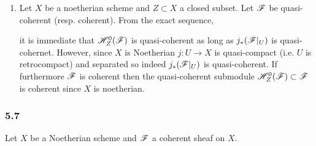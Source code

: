 \documentclass[12pt]{article}
\begin{document}
\begin{enumerate}
\item Let $X$ be a noetherian scheme and $Z \subset X$ a closed subset. Let $\mathscr{F}$ be quasi-coherent (resp. coherent). From the exact sequence,
\begin{center}
\end{center}
it is immediate that $\mathscr{H}^0_Z(\mathscr{F})$ is quasi-coherent as long as $j_* (\mathscr{F}|_U)$ is quasi-cohernet. However, since $X$ is Noetherian $j : U \to X$ is quasi-compact (i.e. $U$ is retrocompact) and separated so indeed $j_* (\mathscr{F}|_U)$ is quasi-coherent. If furthermore $\mathscr{F}$ is coherent then the quasi-coherent submodule $\mathscr{H}^0_Z(\mathscr{F}) \subset \mathscr{F}$ is coherent since $X$ is noetherian.

\end{enumerate}

\subsubsection{5.7}

Let $X$ be a Noetherian scheme and $\mathscr{F}$ a coherent sheaf on $X$.
\end{document}
